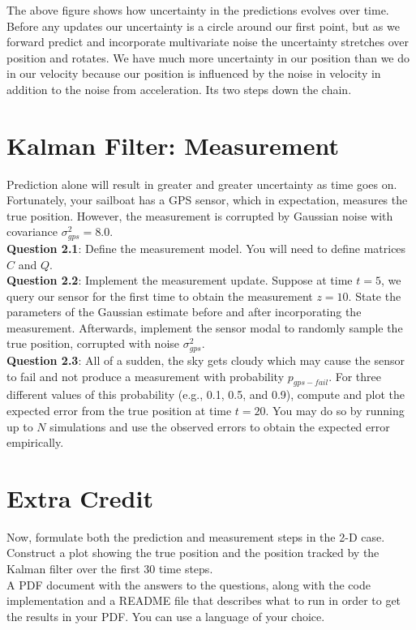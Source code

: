 \documentclass{article}
\begin{document}
The above figure shows how uncertainty in the predictions evolves over time. Before any updates our uncertainty is a circle around our first point, but as we forward predict and incorporate multivariate noise the uncertainty stretches over position and rotates. We have much more uncertainty in our position than we do in our velocity because our position is influenced by the noise in velocity in addition to the noise from acceleration. Its two steps down the chain.

\section{Kalman Filter: Measurement}

Prediction alone will result in greater and greater uncertainty as time goes on. Fortunately, your sailboat has a GPS sensor, which in expectation, measures the true position. However, the measurement is corrupted by Gaussian noise with covariance $\sigma_{gps}^2 = 8.0$.\\

{\bf Question 2.1}: Define the measurement model. You will need to define matrices $C$ and $Q$. \\

{\bf Question 2.2}: Implement the measurement update. Suppose at time $t = 5$, we query our sensor for the first time to obtain the measurement $z = 10$. State the parameters of the Gaussian estimate before and after incorporating the measurement. Afterwards, implement the sensor modal to randomly sample the true position, corrupted with noise $\sigma_{gps}^2$. \\

{\bf Question 2.3}: All of a sudden, the sky gets cloudy which may cause the sensor to fail and not produce a measurement with probability $p_{gps-fail}$. For three different values of this probability (e.g., 0.1, 0.5, and 0.9), compute and plot the expected error from the true position at time $t = 20$. You may do so by running up to $N$ simulations and use the observed errors to obtain the expected error empirically.  

\section{Extra Credit}

Now, formulate both the prediction and measurement steps in the 2-D case. Construct a plot showing the true position and the position tracked by the Kalman filter over the first 30 time steps. \\

 A PDF document with the answers to the questions, along with the code implementation and a README file that describes what to run in order to get the results in your PDF. You can use a language of your choice. 


%
%
\end{document}

